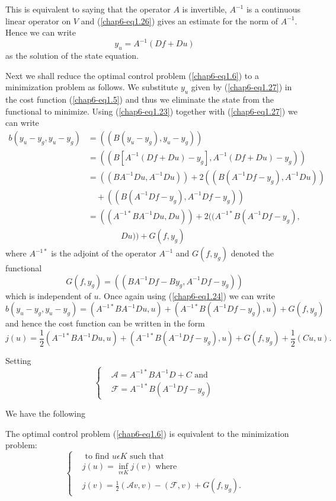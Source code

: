 This is equivalent to saying that the operator $A$ is invertible,
$A^{-1}$ is a continuous linear operator on $V$ and (\ref{chap6-eq1.26})
gives an estimate for the norm of $A^{-1}$. Hence we can write 
\begin{equation*}
y_{u} = A^{-1} (Df + Du)\tag{1.27}\label{chap6-eq1.27}
\end{equation*}
as the solution of the state equation.

Next we shall reduce the optimal control problem (\ref{chap6-eq1.6})
to a minimization problem as follows. We substitute $y_{u}$ given by
(\ref{chap6-eq1.27}) in the cost function (\ref{chap6-eq1.5}) and thus
we eliminate the state from the functional to minimize. Using
(\ref{chap6-eq1.23}) together with (\ref{chap6-eq1.27}) we can write 
\begin{align*}
b(y_{u} - y_{g}, y_{u} - y_{g}) & = ((B(y_{u}- y_{g}), y_{u} - y_{g}))\\
& = ((B[A^{-1} (Df + Du) - y_{g}], A^{-1} (Df+Du) - y_{g}))\\
& = ((BA^{-1} Du, A^{-1} Du)) + 2((B(A^{-1} Df - y_{g}), A^{-1} Du))\\
&    \quad + ((B(A^{-1} Df - y_{g}), A^{-1} Df - y_{g}))\\
& =  ((A^{-1 *} BA^{-1} Du, Du)) + 2((A^{-1*} B(A^{-1} Df - y_{g}),\\
&\qquad\qquad Du)) + G(f, y_{g})
\end{align*}\pageoriginale
where $A^{-1*}$ is the adjoint of the operator $A^{-1}$ and $G(f, y_{g})$ denoted the functional
$$
G(f, y_{g}) = ((BA^{-1} Df - By_{g}, A^{-1} Df - y_{g}))
$$
which is independent of $u$. Once again using (\ref{chap6-eq1.24}) we can write
$$
b(y_{u} - y_{g}, y_{u} - y_{g}) = (A^{-1*} BA^{-1} Du, u) + (A^{-1*} B(A^{-1} Df-y_{g}), u) + G(f, y_{g})
$$
and hence the cost function can be written in the form 
$$
j(u) = \frac{1}{2} (A^{-1*} BA^{-1} Du, u) + (A^{-1*} B(A^{-1} Df
-y_{g}), u) + G(f, y_{g}) + \frac{1}{2} (Cu, u). 
$$

Setting  
\begin{equation*}
\begin{cases}
& \mathscr{A} = A^{-1*} BA^{-1} D + C \text{ and }\\
& \mathscr{F} = A^{-1*} B(A^{-1} Df - y_{g})\tag{1.28}\label{chap6-eq1.28}
\end{cases}
\end{equation*}

We have the following

\begin{proposition}\label{chap6-prop1.1}
The optimal control problem (\ref{chap6-eq1.6}) is equivalent to the minimization problem:
\begin{equation*}
\begin{cases}
& \text{ to find } u \epsilon K \text{ such that }\\
& j(u) = \inf_{v \epsilon K} j(v) \text{ where }\\
& j(v) = \frac{1}{2} (\mathscr{A} v, v) - (\mathscr{F}, v) + G(f, y_{g}).\tag{1.29}\label{chap6-eq1.29}
\end{cases}
\end{equation*}
\end{proposition}

